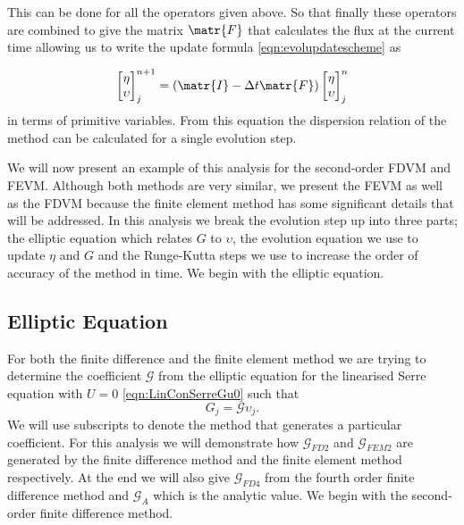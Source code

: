 This can be done for all the operators given above. So that finally these operators are combined to give the matrix $\matr{F}$ that calculates the flux at the current time allowing us to write the update formula \eqref{eqn:evolupdatescheme} as

\begin{equation*}
\begin{bmatrix}
\eta \\ \upsilon
\end{bmatrix}^{n+1}_j = \left(\matr{I}  - \Delta t \matr{F} \right) \begin{bmatrix}
\eta \\ \upsilon
\end{bmatrix}^{n}_j
\end{equation*}
in terms of primitive variables. From this equation the dispersion relation of the method can be calculated for a single evolution step.

We will now present an example of this analysis for the second-order FDVM and FEVM. Although both methods are very similar, we present the FEVM as well as the FDVM because the finite element method has some significant details that will be addressed. In this analysis we break the evolution step up into three parts; the elliptic equation which relates $G$ to $\upsilon$, the evolution equation we use to update $\eta$ and $G$ and the Runge-Kutta steps we use to increase the order of accuracy of the method in time. We begin with the elliptic equation.

\subsection{Elliptic Equation}
For both the finite difference and the finite element method we are trying to determine the coefficient $\mathcal{G}$ from the elliptic equation for the linearised Serre equation with $U=0$ \eqref{eqn:LinConSerreGu0} such that
\[G_j = \mathcal{G}\upsilon_j.\]
We will use subscripts to denote the method that generates a particular coefficient. For this analysis we will demonstrate how $\mathcal{G}_{FD2}$ and $\mathcal{G}_{FEM2}$ are generated by the finite difference method and the finite element method respectively. At the end we will also give $\mathcal{G}_{FD4}$ from the fourth order finite difference method and $\mathcal{G}_A$ which is the analytic value. We begin with the second-order finite difference method.
